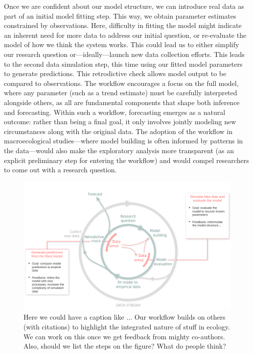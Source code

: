 \documentclass[11pt]{article}
\begin{document}
Once we are confident about our model structure, we can introduce real data as part of an initial model fitting step. This way, we obtain parameter estimates constrained by observations. Here, difficulty in fitting the model might indicate an inherent need for more data to address our initial question, or re-evaluate the model of how we think the system works. This could lead us to either simplify our research question or---ideally---launch new data collection efforts. This leads to the second data simulation step, this time using our fitted model parameters to generate predictions. This retrodictive check allows model output to be compared to observations. %
The workflow encourages a focus on the full model, where any parameter (such as a trend estimate) must be carefully interpreted alongside others, as all are fundamental components that shape both inference and forecasting. 
Within such a workflow, forecasting emerges as a natural outcome: rather than being a final goal, it only involves jointly modeling new circumstances along with the original data. The adoption of the workflow in macroecological studies---where model building is often informed by patterns in the data---would also make the exploratory analysis more transparent (as an explicit preliminary step for entering the workflow) and would compel researchers to come out with a research question. 

\begin{figure}[h]
	\centering
    \hspace*{-1.5cm}
	\includegraphics{figures/figure_worflow}
	\caption{Here we could have a caption like ... Our workflow builds on others (with citations) to highlight the integrated nature of stuff in ecology. We can work on this once we get feedback from mighty co-authors. Also, should we list the steps on the figure? What do people think?} 
	\label{fig:workflowy}
\end{figure}
\end{document}
